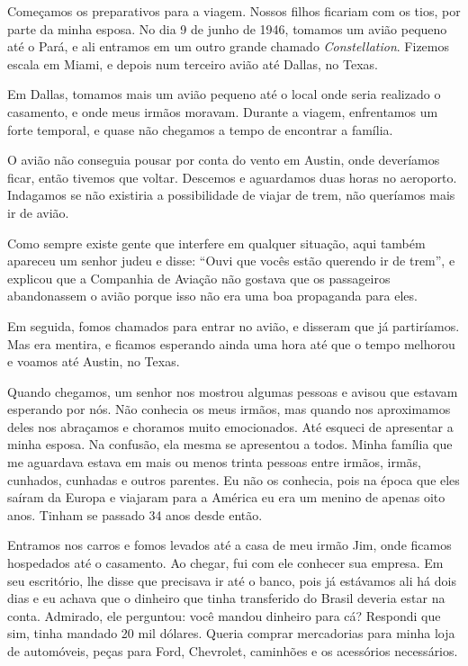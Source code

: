 Começamos os preparativos para a viagem. Nossos filhos ficariam com
os tios, por parte da minha esposa. No dia 9 de junho de 1946, tomamos um avião pequeno até o Pará, e ali entramos em um outro grande chamado \textit{Constellation}. Fizemos escala em Miami, e depois num terceiro avião até Dallas, no Texas.

Em Dallas, tomamos mais um avião pequeno até o local onde seria
realizado o casamento, e onde meus irmãos moravam. Durante a viagem,
enfrentamos um forte temporal, e quase não chegamos a tempo de encontrar a
família.

O avião não conseguia pousar por conta do vento em Austin, onde
deveríamos ficar, então tivemos que voltar. Descemos e aguardamos duas
horas no aeroporto. Indagamos se não existiria a possibilidade
de viajar de trem, não queríamos mais ir de avião. 

Como sempre existe gente que interfere em qualquer situação, aqui também
apareceu um senhor judeu e disse: ``Ouvi que vocês estão querendo ir de
trem'', e explicou que a Companhia de Aviação não gostava que os
passageiros abandonassem o avião porque isso não era uma boa propaganda
para eles.

Em seguida, fomos chamados para entrar no avião, e disseram que já
partiríamos. Mas era mentira, e ficamos esperando ainda uma hora até que o
tempo melhorou e voamos até Austin, no Texas.

Quando chegamos, um senhor nos mostrou algumas pessoas
e avisou que estavam esperando por nós. Não conhecia os meus irmãos, mas
quando nos aproximamos deles nos abraçamos e choramos muito emocionados. 
Até esqueci de apresentar a minha esposa. Na confusão, ela mesma se
apresentou a todos. Minha família que me aguardava estava em 
mais ou menos trinta pessoas entre irmãos, irmãs, cunhados, cunhadas e
outros parentes. Eu não os conhecia, pois na época que eles saíram da
Europa e viajaram para a América eu era um menino de apenas oito anos.
Tinham se passado 34 anos desde então.

Entramos nos carros e fomos levados até a casa de meu irmão Jim,
onde ficamos hospedados até o casamento. Ao chegar, fui com ele conhecer
sua empresa. Em seu escritório, lhe disse que
precisava ir até o banco, pois já estávamos ali há dois dias e eu achava
que o dinheiro que tinha transferido do Brasil deveria estar na conta.
Admirado, ele perguntou: você mandou dinheiro para cá? Respondi que sim,
tinha mandado 20 mil dólares. Queria comprar mercadorias para minha
loja de automóveis, peças para Ford, Chevrolet, caminhões 
e os acessórios necessários.

